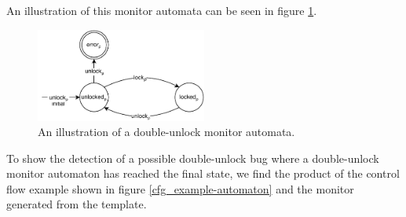 An illustration of this monitor automata can be seen in figure \ref{double-unlock-automata}. 

\begin{figure}[H]
    \centering
    \includegraphics[width=0.5\textwidth]{background/figures/double-unlock}
    \caption{An illustration of a double-unlock monitor automata.}
    \label{double-unlock-automata}
\end{figure}

\newpar To show the detection of a possible double-unlock bug where a double-unlock monitor automaton has reached the final state, we find the product of the control flow example shown in figure \ref{cfg_example-automaton} and the monitor generated from the template. 

